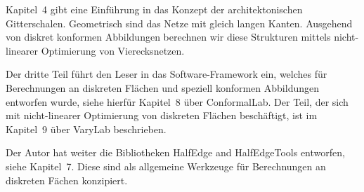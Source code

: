 \documentclass[Thesis.tex]{subfiles}
\begin{document}
Kapitel~4 gibt eine Einf\"{u}hrung in das Konzept der architektonischen Gitterschalen.
Geometrisch sind das Netze mit gleich langen Kanten.
Ausgehend von diskret konformen Abbildungen berechnen wir diese Strukturen mittels nicht-linearer Optimierung von Vierecksnetzen.

Der dritte Teil f\"{u}hrt den Leser in das Software-Framework ein, welches f\"{u}r Berechnungen an diskreten Fl\"{a}chen und speziell konformen Abbildungen entworfen wurde, siehe hierf\"{u}r Kapitel~8 \"{u}ber {\sc ConformalLab}.
Der Teil, der sich mit nicht-linearer Optimierung von diskreten Fl\"{a}chen besch\"{a}ftigt, ist im Kapitel~9 \"{u}ber {\sc VaryLab} beschrieben.

Der Autor hat weiter die Bibliotheken {\sc HalfEdge} and {\sc HalfEdgeTools} entworfen, siehe Kapitel~7.
Diese sind als allgemeine Werkzeuge f\"ur Berechnungen an diskreten F\"{a}chen konzipiert.


\subfilebibliography
\end{document}
